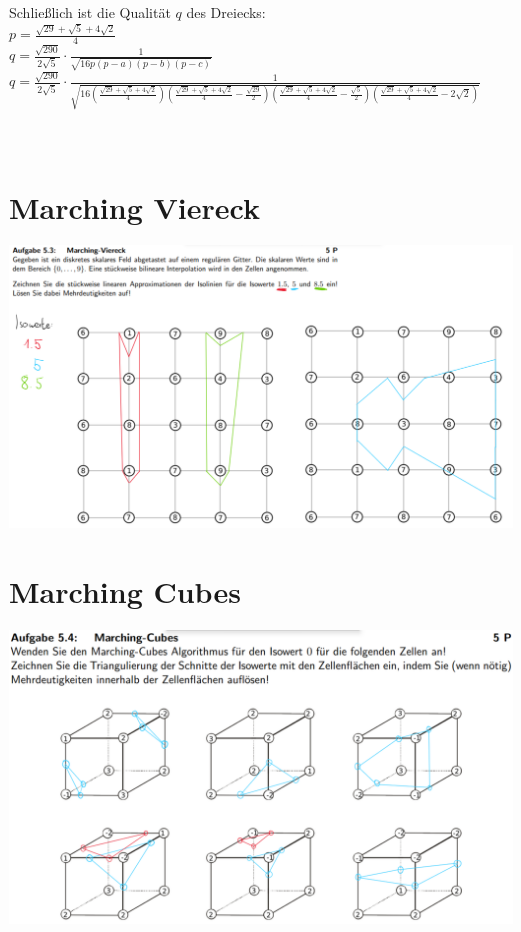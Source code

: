 \documentclass{article}
\begin{document}
\\\\
Schließlich ist die Qualität \( q \) des Dreiecks:\\
$ p = \frac{\sqrt{29} + \sqrt{5} + 4\sqrt{2}}{4} $\\
$ q = \frac{\sqrt{290}}{2\sqrt{5}} \cdot \frac{1}{\sqrt{16p(p - a)(p - b)(p - c)}} $\\
$ q = \frac{\sqrt{290}}{2\sqrt{5}} \cdot \frac{1}{\sqrt{16 \left( \frac{\sqrt{29} + \sqrt{5} + 4\sqrt{2}}{4} \right) \left( \frac{\sqrt{29} + \sqrt{5} + 4\sqrt{2}}{4} - \frac{\sqrt{29}}{2} \right) \left( \frac{\sqrt{29} + \sqrt{5} + 4\sqrt{2}}{4} - \frac{\sqrt{5}}{2} \right) \left( \frac{\sqrt{29} + \sqrt{5} + 4\sqrt{2}}{4} - 2\sqrt{2} \right) }} $\\
\\\\
\section{Marching Viereck}
\includegraphics[width=400pt]{./files/Übung5.3.png}

\section{Marching Cubes}
\includegraphics[width=400pt]{./files/Übung5.4.png}
\\
\\
\end{document}
